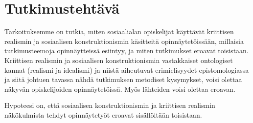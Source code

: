 \section*{Tutkimustehtävä}

Tarkoituksemme on tutkia, miten sosiaalialan opiskelijat käyttävät
kriittisen realismin ja sosiaalisen konstruktionismin käsitteitä
opinnäytetöissään, millaisia tutkimusteemoja opinnäytteissä esiintyy, ja
miten tutkimukset eroavat toisistaan. Kriittisen realismin ja
sosiaalisen konstruktionismin vastakkaiset ontologiset kannat (realismi
ja idealismi) ja niistä aiheutuvat erimielisyydet epistomologiassa ja
siitä johtuen tavassa nähdä tutkimuksen metodiset kysymykset, voisi
olettaa näkyvän opiskelijoiden opinnäytetöissä. Myös lähteiden voisi
olettaa eroavan.

Hypoteesi on, että sosiaalisen konstruktionismin ja kriittisen realismin
näkökulmista tehdyt opinnäytetyöt eroavat sisällöltään toisistaan.
